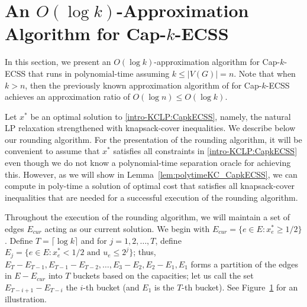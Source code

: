 \documentclass[11pt]{article}
\begin{document}
{
\section{An $O(\log{k})$-Approximation Algorithm for Cap-$k$-ECSS \label{sec:logk-approx}}

In this section, we present an $O(\log k)$-approximation algorithm for
Cap-$k$-ECSS that runs in polynomial-time assuming $k\leq|V(G)|=n$.
Note that when $k>n$, then the previously known approximation algorithm
of \cite{CCKK15} for Cap-$k$-ECSS achieves an approximation ratio of $O(\log{n})\leq{O(\log{k})}$.


Let $x^*$ be an optimal solution to \eqref{intro-KCLP:CapkECSS}, namely, the natural LP relaxation strengthened with knapsack-cover inequalities. We describe below our rounding algorithm. For the presentation of the rounding algorithm, it will be convenient to assume that $x^*$ satisfies all constraints in \eqref{intro-KCLP:CapkECSS} even though we do not know a polynomial-time separation oracle for achieving this. However, as we will show in Lemma~\ref{lem:polytimeKC_CapkECSS}, we can compute in poly-time a solution of optimal cost that satisfies all knapsack-cover inequalities that are needed for a successful execution of the rounding algorithm.

Throughout the execution of the rounding algorithm, we will maintain a set of
edges $E_{cur}$ acting as our current solution.
We begin with $E_{cur} = \{e\in E:x^*_e \geq 1/2\}$.
Define $T = \lceil \log k\rceil$ and
for $j=1,2,\ldots,T$,
define $E_j = \{e\in E: x^*_e < 1/2 \text{ and } u_e \leq 2^j\}$;
thus,
$E_T-E_{T-1}, E_{T-1}-E_{T-2}, \ldots, E_3-E_2, E_2-E_1, E_1$
forms a partition of the edges in $E - E_{cur}$ into $T$ buckets
based on the capacities;
let us call the set $E_{T-i+1} - E_{T-i}$ the $i$-th bucket
(and $E_1$ is the $T$-th bucket).
See Figure~\ref{fig:E-buckets} for an illustration.


\begin{figure}[htb] \label{fig:E-buckets}
{
}
\end{figure}}
\end{document}
